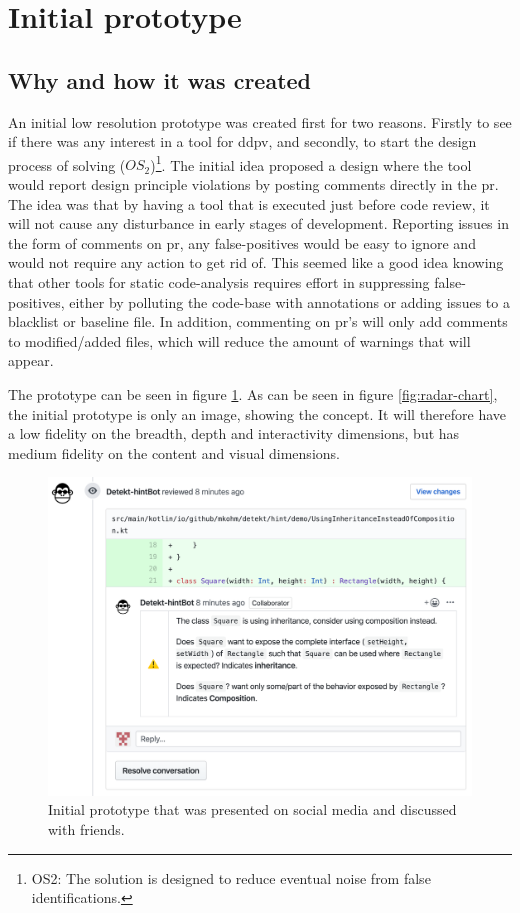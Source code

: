 \documentclass[pdftex,10pt,b5paper,twoside]{report}
\begin{document}
\section{Initial prototype}
\label{initial-prototype}
\subsection*{Why and how it was created}
An initial low resolution prototype was created first for two reasons. Firstly to see if there was any interest in a tool for \gls{ddpv}, and secondly, to start the design process of solving 
(\(OS_{2}\))\footnote{OS2: The solution is designed to reduce eventual noise from false identifications.}. The initial idea proposed a design where the tool would report design principle violations by posting comments directly in the \gls{pr}. The idea was that by having a tool that is executed just before code review, it will not cause any disturbance in early stages of development. Reporting issues in the form of comments on \gls{pr}, any false-positives would be easy to ignore and would not require any action to get rid of. This seemed like a good idea knowing that other tools for static code-analysis requires effort in suppressing false-positives, either by polluting the code-base with annotations or adding issues to a blacklist or baseline file. In addition, commenting on \gls{pr}'s will only add comments to modified/added files, which will reduce the amount of warnings that will appear.  

The prototype can be seen in figure \ref{fig:mockup}. As can be seen in figure \ref{fig:radar-chart}, the initial prototype is only an image, showing the concept. It will therefore have a low fidelity on the breadth, depth and interactivity dimensions, but has medium fidelity on the content and visual dimensions. 


\begin{figure}[h!]
    \centering
    \includegraphics[width=\textwidth]{../images/demo.png}
    \caption{Initial prototype that was presented on social media and discussed with friends.}
    \label{fig:mockup}
\end{figure}
\end{document}
